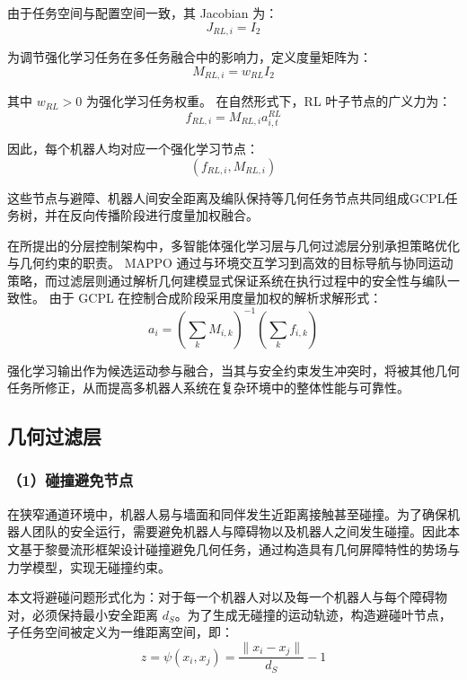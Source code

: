 由于任务空间与配置空间一致，其 Jacobian 为：
\begin{equation}
    J_{RL,i} = I_2
\end{equation}

为调节强化学习任务在多任务融合中的影响力，定义度量矩阵为：
\begin{equation}
    M_{RL,i} = w_{RL} I_2
\end{equation}

其中 $w_{RL} > 0$ 为强化学习任务权重。
在自然形式下，RL 叶子节点的广义力为：
\begin{equation}
    f_{RL,i} = M_{RL,i} a_{i,t}^{RL}
\end{equation}

因此，每个机器人均对应一个强化学习节点：
\begin{equation}
    (f_{RL,i}, M_{RL,i})
\end{equation}

这些节点与避障、机器人间安全距离及编队保持等几何任务节点共同组成GCPL任务树，并在反向传播阶段进行度量加权融合。

在所提出的分层控制架构中，多智能体强化学习层与几何过滤层分别承担策略优化与几何约束的职责。
MAPPO 通过与环境交互学习到高效的目标导航与协同运动策略，而过滤层则通过解析几何建模显式保证系统在执行过程中的安全性与编队一致性。
由于 GCPL 在控制合成阶段采用度量加权的解析求解形式：
\begin{equation}
    a_i =
    \left(
    \sum_k M_{i,k}
    \right)^{-1}
    \left(
    \sum_k f_{i,k}
    \right)
\end{equation}

强化学习输出作为候选运动参与融合，当其与安全约束发生冲突时，将被其他几何任务所修正，从而提高多机器人系统在复杂环境中的整体性能与可靠性。

\subsection{几何过滤层}
\subsubsection{（1）碰撞避免节点}
在狭窄通道环境中，机器人易与墙面和同伴发生近距离接触甚至碰撞。为了确保机器人团队的安全运行，需要避免机器人与障碍物以及机器人之间发生碰撞。因此本文基于黎曼流形框架设计碰撞避免几何任务，通过构造具有几何屏障特性的势场与力学模型，实现无碰撞约束。

本文将避碰问题形式化为：对于每一个机器人对以及每一个机器人与每个障碍物对，必须保持最小安全距离 $d_S$。为了生成无碰撞的运动轨迹，构造避碰叶节点，子任务空间被定义为一维距离空间，即：
\begin{equation}
    z = \psi(x_i, x_j) = \frac{\|x_i - x_j\|}{d_S} - 1
\end{equation}


